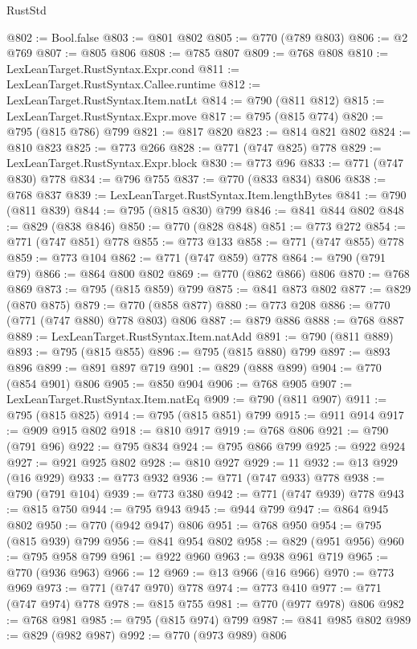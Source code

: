 \begin{lexlean}{RustStd}
\begin{coremodule}
{\begin{coremodule}
{{{{{{{{{{{{{{{@802 := Bool.false
@803 := @801 @802
@805 := @770 (@789 @803)
@806 := @2 @769
@807 := @805 @806
@808 := @785 @807
@809 := @768 @808
@810 := LexLeanTarget.RustSyntax.Expr.cond
@811 := LexLeanTarget.RustSyntax.Callee.runtime
@812 := LexLeanTarget.RustSyntax.Item.natLt
@814 := @790 (@811 @812)
@815 := LexLeanTarget.RustSyntax.Expr.move
@817 := @795 (@815 @774)
@820 := @795 (@815 @786) @799
@821 := @817 @820
@823 := @814 @821 @802
@824 := @810 @823
@825 := @773 @266
@828 := @771 (@747 @825) @778
@829 := LexLeanTarget.RustSyntax.Expr.block
@830 := @773 @96
@833 := @771 (@747 @830) @778
@834 := @796 @755
@837 := @770 (@833 @834) @806
@838 := @768 @837
@839 := LexLeanTarget.RustSyntax.Item.lengthBytes
@841 := @790 (@811 @839)
@844 := @795 (@815 @830) @799
@846 := @841 @844 @802
@848 := @829 (@838 @846)
@850 := @770 (@828 @848)
@851 := @773 @272
@854 := @771 (@747 @851) @778
@855 := @773 @133
@858 := @771 (@747 @855) @778
@859 := @773 @104
@862 := @771 (@747 @859) @778
@864 := @790 (@791 @79)
@866 := @864 @800 @802
@869 := @770 (@862 @866) @806
@870 := @768 @869
@873 := @795 (@815 @859) @799
@875 := @841 @873 @802
@877 := @829 (@870 @875)
@879 := @770 (@858 @877)
@880 := @773 @208
@886 := @770 (@771 (@747 @880) @778 @803) @806
@887 := @879 @886
@888 := @768 @887
@889 := LexLeanTarget.RustSyntax.Item.natAdd
@891 := @790 (@811 @889)
@893 := @795 (@815 @855)
@896 := @795 (@815 @880) @799
@897 := @893 @896
@899 := @891 @897 @719
@901 := @829 (@888 @899)
@904 := @770 (@854 @901) @806
@905 := @850 @904
@906 := @768 @905
@907 := LexLeanTarget.RustSyntax.Item.natEq
@909 := @790 (@811 @907)
@911 := @795 (@815 @825)
@914 := @795 (@815 @851) @799
@915 := @911 @914
@917 := @909 @915 @802
@918 := @810 @917
@919 := @768 @806
@921 := @790 (@791 @96)
@922 := @795 @834
@924 := @795 @866 @799
@925 := @922 @924
@927 := @921 @925 @802
@928 := @810 @927
@929 := 11
@932 := @13 @929 (@16 @929)
@933 := @773 @932
@936 := @771 (@747 @933) @778
@938 := @790 (@791 @104)
@939 := @773 @380
@942 := @771 (@747 @939) @778
@943 := @815 @750
@944 := @795 @943
@945 := @944 @799
@947 := @864 @945 @802
@950 := @770 (@942 @947) @806
@951 := @768 @950
@954 := @795 (@815 @939) @799
@956 := @841 @954 @802
@958 := @829 (@951 @956)
@960 := @795 @958 @799
@961 := @922 @960
@963 := @938 @961 @719
@965 := @770 (@936 @963)
@966 := 12
@969 := @13 @966 (@16 @966)
@970 := @773 @969
@973 := @771 (@747 @970) @778
@974 := @773 @410
@977 := @771 (@747 @974) @778
@978 := @815 @755
@981 := @770 (@977 @978) @806
@982 := @768 @981
@985 := @795 (@815 @974) @799
@987 := @841 @985 @802
@989 := @829 (@982 @987)
@992 := @770 (@973 @989) @806
}}}}}}}}}}}}}}}
\end{coremodule}}
\end{coremodule}
\end{lexlean}
